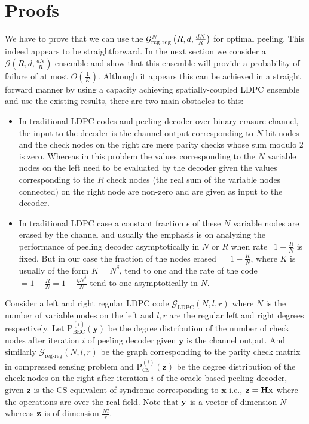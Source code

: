 \documentclass[conference,onecolumn]{IEEEtran}
\begin{document}
\section{Proofs}
We have to prove that we can use the $\mathcal{G}^N_{\rm reg,reg}\left(R,d, \frac{dN}{R} \right)$ for optimal peeling. This indeed appears to be straightforward.
In the next section we consider a $\mathcal{G}(R,d,\frac{dN}{R})$ ensemble and show that this ensemble will provide a probability of failure of at most $O\left(\frac{1}{K}\right)$. Although it appears this can be achieved in a straight forward manner by using a capacity achieving spatially-coupled LDPC ensemble and use the existing results, there are two main obstacles to this:
\begin{itemize}
\item  In traditional LDPC codes and peeling decoder over binary erasure channel, the input to the decoder is the channel output corresponding to $N$ bit nodes and the check nodes on the right are mere parity checks whose sum modulo 2 is zero. Whereas in this problem the values corresponding to the $N$ variable nodes on the left need to be evaluated by the decoder given the values corresponding to the $R$ check nodes (the real sum of the variable nodes connected) on the right node are non-zero  and are given as input to the decoder.\\
\item  In traditional LDPC case a constant fraction $\epsilon$ of these $N$ variable nodes are erased by the channel and usually the emphasis is on analyzing the performance of peeling decoder asymptotically in $N$ or $R$ when rate=$1-\frac{R}{N}$ is fixed. But in our case the fraction of the nodes erased $=1-\frac{K}{N}$, where $K$ is usually of the form $K=N^{\delta}$, tend to one and the rate of the code$=1-\frac{R}{N}=1-\frac{\eta N^{\delta}}{N}$ tend to one asymptotically in $N$.
\end{itemize}
\vspace{1ex}

Consider a left and right regular LDPC code $\mathcal{G}_{\text{LDPC}}(N,l,r)$ where $N$ is the number of variable nodes on the left and $l,r$ are the regular left and right degrees respectively. Let $\text{P}_{\text{BEC}}^{(i)}(\mathbf{y})$ be the degree distribution of the number of check nodes after iteration $i$ of peeling decoder given $\mathbf{y}$ is the channel output. And similarly $\mathcal{G}_{\text{reg-reg}}(N,l,r)$ be the graph corresponding to the parity check matrix in compressed sensing problem and $\text{P}_{\text{CS}}^{(i)}(\mathbf{z})$ be the degree distribution of the check nodes on the right after iteration $i$ of the oracle-based peeling decoder, given $\mathbf{z}$ is the CS equivalent of syndrome corresponding to $\mathbf{x}$ i.e., $\mathbf{z}=\mathbf{H}\mathbf{x}$ where the operations are over the real field. Note that $\mathbf{y}$ is a vector of dimension $N$ whereas $\mathbf{z}$ is of dimension $\frac{Nl}{r}$.\\
\end{document}

